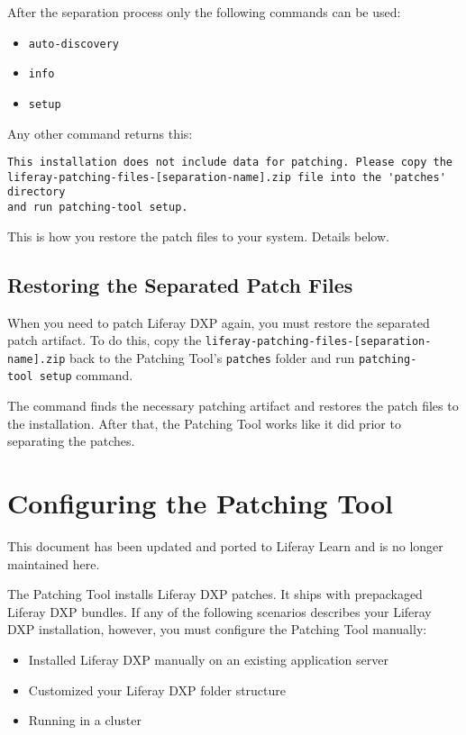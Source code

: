 After the separation process only the following commands can be used:

\begin{itemize}
\tightlist
\item
  \texttt{auto-discovery}
\item
  \texttt{info}
\item
  \texttt{setup}
\end{itemize}

Any other command returns this:

\begin{verbatim}
This installation does not include data for patching. Please copy the
liferay-patching-files-[separation-name].zip file into the 'patches' directory
and run patching-tool setup. 
\end{verbatim}

This is how you restore the patch files to your system. Details below.

\section{Restoring the Separated Patch
Files}\label{restoring-the-separated-patch-files}

When you need to patch Liferay DXP again, you must restore the separated
patch artifact. To do this, copy the
\texttt{liferay-patching-files-{[}separation-name{]}.zip} back to the
Patching Tool's \texttt{patches} folder and run
\texttt{patching-tool\ setup} command.

The command finds the necessary patching artifact and restores the patch
files to the installation. After that, the Patching Tool works like it
did prior to separating the patches.

\chapter{Configuring the Patching
Tool}\label{configuring-the-patching-tool}

{This document has been updated and ported to Liferay Learn and is no
longer maintained here.}

The Patching Tool installs Liferay DXP patches. It ships with
prepackaged Liferay DXP bundles. If any of the following scenarios
describes your Liferay DXP installation, however, you must configure the
Patching Tool manually:

\begin{itemize}
\tightlist
\item
  Installed Liferay DXP manually on an existing application server
\item
  Customized your Liferay DXP folder structure
\item
  Running in a cluster
\end{itemize}

